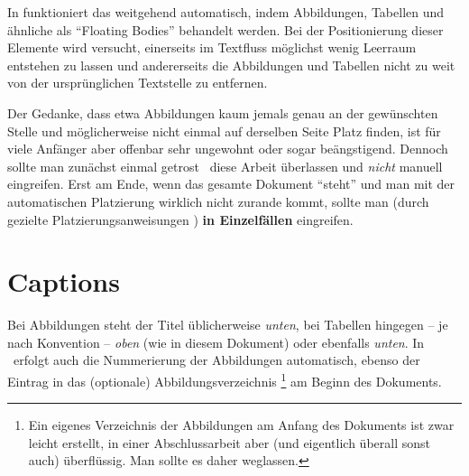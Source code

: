 In \latex funktioniert das weitgehend automatisch, indem
Abbildungen, Tabellen und ähnliche als "`Floating Bodies"'
behandelt werden. Bei der Positionierung dieser Elemente wird
versucht, einerseits im Textfluss möglichst wenig Leer\-raum
entstehen zu lassen und andererseits die Abbildungen und Tabellen
nicht zu weit von der ursprünglichen Textstelle zu entfernen.

Der Gedanke, dass etwa Abbildungen kaum jemals genau an der
ge\-wünsch\-ten Stelle und möglicherweise nicht einmal auf
derselben Seite Platz finden, ist für viele Anfänger aber offenbar sehr
ungewohnt oder sogar beängstigend. Dennoch sollte man zunächst einmal
getrost \latex\ diese Arbeit überlassen und \emph{nicht} manuell
eingreifen. Erst am Ende, wenn das gesamte Dokument "`steht"' und
man mit der automatischen Platzierung wirklich nicht zurande
kommt, sollte man (durch gezielte Platzierungsanweisungen
\cite[S.~49]{Oetiker2014}) \textbf{in Einzelfällen} eingreifen.



\section{Captions}

Bei Abbildungen steht der Titel üblicherweise \emph{unten}, bei
Tabellen hingegen -- je nach Konvention -- \emph{oben} (wie in diesem Dokument) 
oder ebenfalls \emph{unten}. In \latex\ erfolgt
auch die Nummerierung der Abbildungen automatisch, ebenso der
Eintrag in das (optionale)
Abbildungsverzeichnis%
\footnote{Ein eigenes Verzeichnis der Abbildungen am Anfang des Dokuments
ist zwar leicht erstellt, in einer Abschlussarbeit aber (und eigentlich
überall sonst auch) überflüssig. Man sollte es daher weglassen.}
am Beginn des Dokuments.

